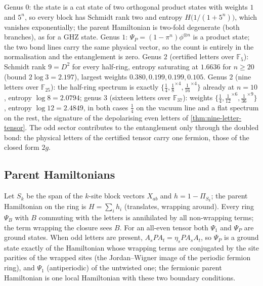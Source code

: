 \begin{observation}
\label{obs:example-entanglement}
Genus $0$: the state is a cat state of two orthogonal product states with weights
$1$ and $5^n$, so every block has Schmidt rank two and entropy $H\bigl(1/(1+5^n)\bigr)$,
which vanishes exponentially; the parent Hamiltonian is two-fold degenerate (both branches),
as for a GHZ state. Genus $1$: $\Psi_P = (1-\pi^n)\phi^{\otimes n}$ is a product state; the two
bond lines carry the same physical vector, so the count is entirely in the normalisation and
the entanglement is zero. Genus $2$ (certified letters over $\mathbb F_5$): Schmidt rank
$9 = D^2$ for every half-ring, entropy saturating at $1.6636$ for $n\ge20$ (bound
$2\log3 = 2.197$), largest weights $0.380, 0.199, 0.199, 0.105$. Genus $2$ (nine letters over
$\mathbb F_{25}$): the half-ring spectrum is exactly $\{\tfrac14,\tfrac18^{\times4},\tfrac1{16}^{\times4}\}$
already at $n = 10$, entropy $\log8 = 2.0794$; genus $3$ (sixteen letters over $\mathbb F_{37}$):
weights $\{\tfrac14,\tfrac1{12}^{\times6},\tfrac1{36}^{\times9}\}$, entropy $\log12 = 2.4849$, in
both cases $\tfrac14$ on the vacuum line and a flat spectrum on the rest, the signature of the
depolarising even letters of \cref{thm:nine-letter-tensor}. The odd sector contributes to the
entanglement only through the doubled bond: the physical letters of the certified tensor
carry one fermion, those of the closed form $2g$.
\end{observation}

\subsection{Parent Hamiltonians}

\begin{proposition}
\label{prop:example-parent-hamiltonian}
Let $S_k$ be the span of the $k$-site block vectors $X_{ab}$ and $h = 1-\Pi_{S_k}$; the parent
Hamiltonian on the ring is $H = \sum_ih_i$ (translates, wrapping around). Every ring
$\Psi_B$ with $B$ commuting with the letters is annihilated by all non-wrapping terms; the
term wrapping the closure sees $B$. For an all-even tensor both $\Psi_1$ and $\Psi_P$ are
ground states. When odd letters are present, $A_sPA_t = \eta_sPA_sA_t$, so $\Psi_P$ is a ground
state exactly of the Hamiltonian whose wrapping terms are conjugated by the site parities of
the wrapped sites (the Jordan--Wigner image of the periodic fermion ring), and $\Psi_1$
(antiperiodic) of the untwisted one; the fermionic parent Hamiltonian is one local
Hamiltonian with these two boundary conditions.
\end{proposition}

